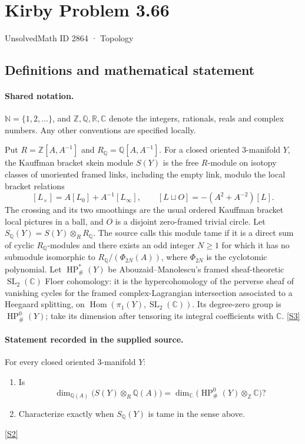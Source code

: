 \documentclass[11pt]{article}
\newcommand{\sref}[2]{\hyperlink{source:#1:#2}{[S#2]}}
\begin{document}
\setcounter{section}{2863}
\section{Kirby Problem 3.66}\label{2864}
{\small\sffamily UnsolvedMath ID 2864 · Topology}
\subsection{Definitions and mathematical statement}

\paragraph{Shared notation.}$\mathbb N=\{1,2,\ldots\}$, and $\mathbb Z,\mathbb Q,\mathbb R,\mathbb C$ denote the integers, rationals, reals and complex numbers. Any other conventions are specified locally.


Put $R=\mathbb Z[A,A^{-1}]$ and $R_{\mathbb Q}=\mathbb Q[A,A^{-1}]$. For a closed oriented $3$-manifold $Y$, the Kauffman bracket skein module $S(Y)$ is the free $R$-module on isotopy classes of unoriented framed links, including the empty link, modulo the local bracket relations
\[
[L_\times]=A[L_0]+A^{-1}[L_\infty],\qquad
[L\sqcup O]=-(A^2+A^{-2})[L].
\]
The crossing and its two smoothings are the usual ordered Kauffman bracket local pictures in a ball, and $O$ is a disjoint zero-framed trivial circle. Let $S_{\mathbb Q}(Y)=S(Y)\otimes_R R_{\mathbb Q}$. The source calls this module tame if it is a direct sum of cyclic $R_{\mathbb Q}$-modules and there exists an odd integer $N\ge1$ for which it has no submodule isomorphic to $R_{\mathbb Q}/(\Phi_{2N}(A))$, where $\Phi_{2N}$ is the cyclotomic polynomial.
Let $\operatorname{HP}^*_{\#}(Y)$ be Abouzaid--Manolescu's framed sheaf-theoretic $\operatorname{SL}_2(\mathbb C)$ Floer cohomology: it is the hypercohomology of the perverse sheaf of vanishing cycles for the framed complex-Lagrangian intersection associated to a Heegaard splitting, on $\operatorname{Hom}(\pi_1(Y),\operatorname{SL}_2(\mathbb C))$. Its degree-zero group is $\operatorname{HP}^0_{\#}(Y)$; take its dimension after tensoring its integral coefficients with $\mathbb C$. \sref{2864}{3}
\paragraph{Statement recorded in the supplied source.}
For every closed oriented $3$-manifold $Y$:
\begin{enumerate}
\item Is
\[
\dim_{\mathbb Q(A)}\bigl(S(Y)\otimes_R\mathbb Q(A)\bigr)
=\dim_{\mathbb C}\bigl(\operatorname{HP}^0_{\#}(Y)\otimes_{\mathbb Z}\mathbb C\bigr)?
\]
\item Characterize exactly when $S_{\mathbb Q}(Y)$ is tame in the sense above.
\end{enumerate}
\sref{2864}{2}
\end{document}
